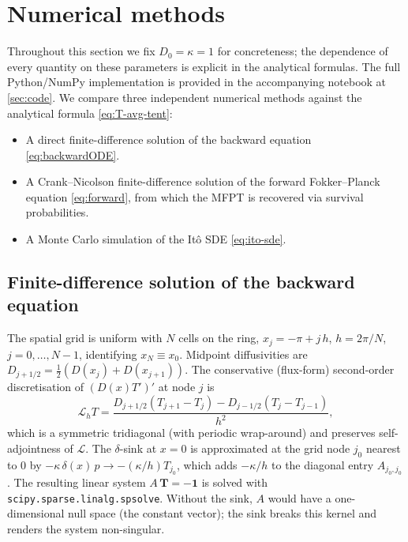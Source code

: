 
\section{Numerical methods}
\label{sec:numerics}

Throughout this section we fix $D_0=\kappa=1$ for concreteness; the dependence
of every quantity on these parameters is explicit in the analytical formulas.
The full Python/NumPy implementation is provided in the accompanying notebook
at \autoref{sec:code}.  We compare three independent
numerical methods against the analytical formula \eqref{eq:T-avg-tent}:

\begin{itemize}
\item A direct finite-difference solution of the backward equation
  \eqref{eq:backwardODE}.
\item A Crank--Nicolson finite-difference solution of the forward Fokker--Planck
  equation \eqref{eq:forward}, from which the MFPT is recovered via survival
  probabilities.
\item A Monte Carlo simulation of the It\^o SDE \eqref{eq:ito-sde}.
\end{itemize}

\subsection{Finite-difference solution of the backward equation}

The spatial grid is uniform with $N$ cells on the ring,
$x_j=-\pi+j\,h$, $h=2\pi/N$, $j=0,\dots,N-1$, identifying $x_N\equiv x_0$.
Midpoint diffusivities are $D_{j+1/2}=\tfrac12(D(x_j)+D(x_{j+1}))$.  The
conservative (flux-form) second-order discretisation of
$(D(x)T')'$ at node $j$ is
\begin{equation}
\mathcal{L}_h T
=\frac{D_{j+1/2}(T_{j+1}-T_j)-D_{j-1/2}(T_j-T_{j-1})}{h^2},
\label{eq:fd-stencil}
\end{equation}
which is a symmetric tridiagonal (with periodic wrap-around) and preserves
self-adjointness of $\mathcal{L}$.  The $\delta$-sink at $x=0$ is approximated
at the grid node $j_0$ nearest to $0$ by $-\kappa\,\delta(x)\,p\to-(\kappa/h)T_{j_0}$,
which adds $-\kappa/h$ to the diagonal entry $A_{j_0,j_0}$.  The resulting
linear system $A\,\mathbf{T}=-\mathbf{1}$ is solved with
\texttt{scipy.sparse.linalg.spsolve}.  Without the sink, $A$ would have a
one-dimensional null space (the constant vector); the sink breaks this kernel
and renders the system non-singular.

